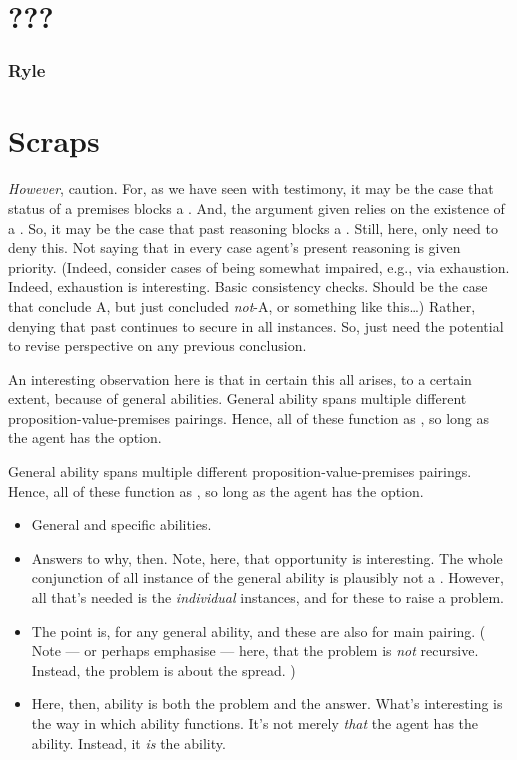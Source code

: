 \section{???}

\subsubsection{Ryle}


\section{Scraps}
\label{sec:scraps}

\begin{note}
  \emph{However}, caution.
  For, as we have seen with testimony, it may be the case that status of a premises blocks a \requ{}.
  And, the argument given relies on the existence of a \requ{}.
  So, it may be the case that past reasoning blocks a \requ{}.
  Still, here, only need to deny this.
  Not saying that in every case agent's present reasoning is given priority.
  (Indeed, consider cases of being somewhat impaired, e.g., via exhaustion.
  Indeed, exhaustion is interesting.
  Basic consistency checks.
  Should be the case that conclude A, but just concluded \emph{not}-A, or something like this\dots)
  Rather, denying that past continues to secure in all instances.
  So, just need the potential to revise perspective on any previous conclusion.
\end{note}

\begin{note}
  An interesting observation here is that in certain this all arises, to a certain extent, because of general abilities.
  General ability spans multiple different proposition-value-premises pairings.
  Hence, all of these function as , so long as the agent has the option.

  General ability spans multiple different proposition-value-premises pairings.
  Hence, all of these function as , so long as the agent has the option.

  \begin{itemize}
  \item
    General and specific abilities.
  \item
    Answers to why, then.
    Note, here, that opportunity is interesting.
    The whole conjunction of all instance of the general ability is plausibly not a \requ{}.
    However, all that's needed is the \emph{individual} instances, and for these to raise a problem.
  \item
    The point is,  for any general ability, and these are also  for main pairing.
    (%
    Note --- or perhaps emphasise --- here, that the problem is \emph{not} recursive.
    Instead, the problem is about the spread.%
    )
  \item
    Here, then, ability is both the problem and the answer.
    What's interesting is the way in which ability functions.
    It's not merely \emph{that} the agent has the ability.
    Instead, it \emph{is} the ability.
  \end{itemize}
\end{note}

